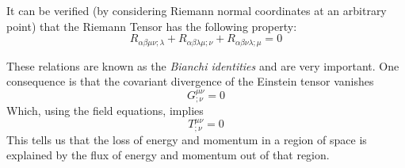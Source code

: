  
It can be verified (by considering Riemann normal coordinates at an arbitrary point) that the Riemann Tensor has the following property:
\begin{equation}
 R_{\alpha \beta \mu \nu ; \lambda} + R_{\alpha \beta \lambda\mu ; \nu} + R_{\alpha \beta \nu \lambda ; \mu} = 0 
 \label{eq:Bianchi}
\end{equation}
 
These relations are known as the \emph{Bianchi identities} and are very important. One consequence is that the covariant divergence of the Einstein tensor vanishes 
\[ G^{\mu \nu}_{; \nu} =0 \]
Which, using the field equations, implies
\[ T^{\mu \nu}_{; \nu} =0 \]
This tells us that the loss of energy and momentum in a region of space is explained by the flux of energy and momentum out of that region. 

